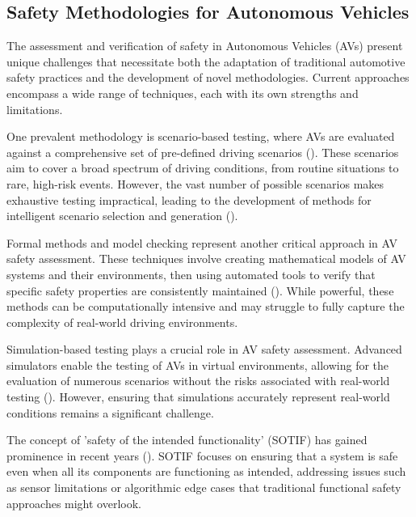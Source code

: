 
\subsection{Safety Methodologies for Autonomous Vehicles}

The assessment and verification of safety in Autonomous Vehicles (AVs) present unique challenges that necessitate both the adaptation of traditional automotive safety practices and the development of novel methodologies. Current approaches encompass a wide range of techniques, each with its own strengths and limitations.

One prevalent methodology is scenario-based testing, where AVs are evaluated against a comprehensive set of pre-defined driving scenarios (\cite{Feng2021}). These scenarios aim to cover a broad spectrum of driving conditions, from routine situations to rare, high-risk events. However, the vast number of possible scenarios makes exhaustive testing impractical, leading to the development of methods for intelligent scenario selection and generation (\cite{Koren2018}).

Formal methods and model checking represent another critical approach in AV safety assessment. These techniques involve creating mathematical models of AV systems and their environments, then using automated tools to verify that specific safety properties are consistently maintained (\cite{Luckcuck2019}). While powerful, these methods can be computationally intensive and may struggle to fully capture the complexity of real-world driving environments.

Simulation-based testing plays a crucial role in AV safety assessment. Advanced simulators enable the testing of AVs in virtual environments, allowing for the evaluation of numerous scenarios without the risks associated with real-world testing (\cite{Dosovitskiy2017}). However, ensuring that simulations accurately represent real-world conditions remains a significant challenge.

The concept of 'safety of the intended functionality' (SOTIF) has gained prominence in recent years (\cite{ISO21448}). SOTIF focuses on ensuring that a system is safe even when all its components are functioning as intended, addressing issues such as sensor limitations or algorithmic edge cases that traditional functional safety approaches might overlook.

